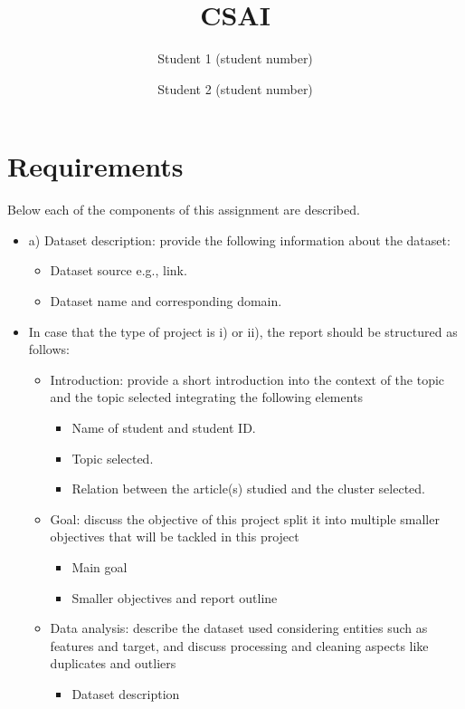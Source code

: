 \documentclass[]{article}
\title{CSAI}
\author{Student 1 \small(student number) \and Student 2 \small(student number)}
\begin{document}
\maketitle

\section{Requirements}

Below each of the components of this assignment are described.

\begin{itemize}
    \item a) Dataset description: provide the following information about the dataset:
    \begin{itemize}
        \item Dataset source e.g., link.
        \item Dataset name and corresponding domain.
    \end{itemize}
    \item In case that the type of project is i) or ii), the report should be structured as follows:
    \begin{itemize}
        \item Introduction: provide a short introduction into the context of the topic and the topic selected integrating the following elements
        \begin{itemize}
            \item Name of student and student ID.
            \item Topic selected.
            \item Relation between the article(s) studied and the cluster selected.
        \end{itemize}
        \item Goal: discuss the objective of this project split it into multiple smaller objectives that will be tackled in this project
        \begin{itemize}
            \item Main goal
            \item Smaller objectives and report outline
        \end{itemize}
        \item Data analysis: describe the dataset used considering entities such as features and target, and discuss processing and cleaning aspects like duplicates and outliers
        \begin{itemize}
            \item Dataset description

\end{itemize}
\end{itemize}
\end{itemize}
\end{document}
